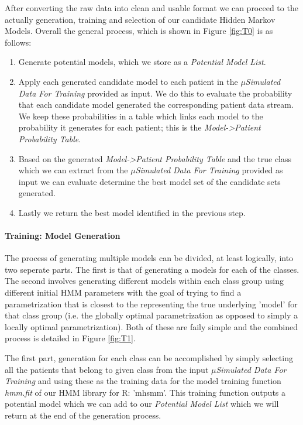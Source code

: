 \documentclass[]{article}
\begin{document}
After converting the raw data into clean and usable format we can proceed to the actually generation, training and selection of our candidate Hidden Markov Models. Overall the general process, which is shown in Figure \ref{fig:T0} is as follows:
\begin{enumerate}
	\item Generate potential models, which we store as a \textit{Potential Model List}. 
	\item Apply each generated candidate model to each patient in the \textit{$\mu$Simulated Data For Training} provided as input. We do this to evaluate the probability that each candidate model generated the corresponding patient data stream. We keep these probabilities in a table which links each model to the probability it generates for each patient; this is the \textit{Model-\textgreater Patient Probability Table}.
	\item Based on the generated \textit{Model-\textgreater Patient Probability Table} and the true class which we can extract from the \textit{$\mu$Simulated Data For Training} provided as input we can evaluate determine the best model set of the candidate sets generated. 
	\item Lastly we return the best model identified in the previous step.
\end{enumerate}

\paragraph{Training: Model Generation}

The process of generating multiple models can be divided, at least logically, into two seperate parts. The first is that of generating a models for each of the classes. The second involves generating different models within each class group using different initial HMM parameters with the goal of trying to find a parametrization that is closest to the representing the true underlying 'model' for that class group (i.e. the globally optimal parametrization as opposed to simply a locally optimal parametrization). Both of these are faily simple and the combined process is detailed in Figure \ref{fig:T1}. 

The first part, generation for each class can be accomplished by simply selecting all the patients that belong to given class from the input \textit{$\mu$Simulated Data For Training} and using these as the training data for the model training function \textit{hmm.fit} of our HMM library for R: 'mhsmm'. This training function outputs a potential model which we can add to our \textit{Potential Model List} which we will return at the end of the generation process. 
\end{document}
